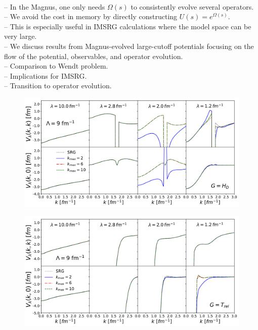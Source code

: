 \documentclass[preprintnumbers,floatfix,aps,prc,preprint,nofootinbib]{revtex4-1}
\begin{document}
\\
-- In the Magnus, one only needs $\Omega(s)$ to consistently evolve several operators.
\\
-- We avoid the cost in memory by directly constructing $U(s)=e^{\Omega(s)}$.
\\
-- This is especially useful in IMSRG calculations where the model space can be very large.
\\
-- We discuss results from Magnus-evolved large-cutoff potentials focusing on the flow of the potential, observables, and operator evolution.
\\
-- Comparison to Wendt problem.
\\
-- Implications for IMSRG.
\\
-- Transition to operator evolution.
%
\begin{figure}[H]
	\centering
	\includegraphics[clip,width=0.7\columnwidth]{Magnus/potential_diagonals_offdiags_kvnn901_Wegner}%
	\label{fig:potential_slices_high_cutoffs_Wegner}
\end{figure}
%
\begin{figure}[H]
	\centering
	\includegraphics[clip,width=0.7\columnwidth]{Magnus/potential_diagonals_offdiags_kvnn901_T}%
	\label{fig:potential_slices_high_cutoffs_T}
\end{figure}
%
%
\end{document}
